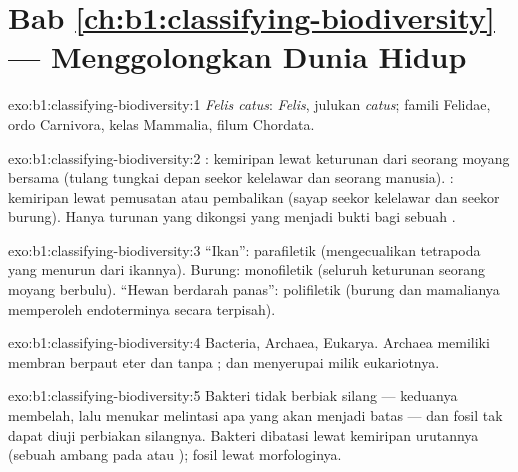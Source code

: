 \section*{Bab \ref{ch:b1:classifying-biodiversity} --- Menggolongkan Dunia Hidup}

\begin{solution}{exo:b1:classifying-biodiversity:1}
\emph{Felis catus}:  \emph{Felis}, julukan \emph{catus}; famili
Felidae, ordo Carnivora, kelas Mammalia, filum Chordata.
\end{solution}

\begin{solution}{exo:b1:classifying-biodiversity:2}
: kemiripan lewat keturunan dari seorang moyang bersama
(tulang tungkai depan seekor kelelawar dan seorang manusia).
: kemiripan lewat pemusatan atau pembalikan (sayap seekor
kelelawar dan seekor burung). Hanya  turunan yang dikongsi
yang menjadi bukti bagi sebuah .
\end{solution}

\begin{solution}{exo:b1:classifying-biodiversity:3}
``Ikan'': parafiletik (mengecualikan tetrapoda yang menurun dari
ikannya). Burung: monofiletik (seluruh keturunan seorang moyang
berbulu). ``Hewan berdarah panas'': polifiletik (burung dan mamalianya
memperoleh endoterminya secara terpisah).
\end{solution}

\begin{solution}{exo:b1:classifying-biodiversity:4}
Bacteria, Archaea, Eukarya. Archaea memiliki  membran berpaut
eter dan tanpa ;  dan  
menyerupai milik eukariotnya.
\end{solution}

\begin{solution}{exo:b1:classifying-biodiversity:5}
Bakteri tidak berbiak silang --- keduanya membelah, lalu menukar 
melintasi apa yang akan menjadi batas  --- dan fosil tak dapat
diuji perbiakan silangnya. Bakteri dibatasi lewat kemiripan urutannya
(sebuah ambang pada  atau ); fosil lewat
morfologinya.
\end{solution}

